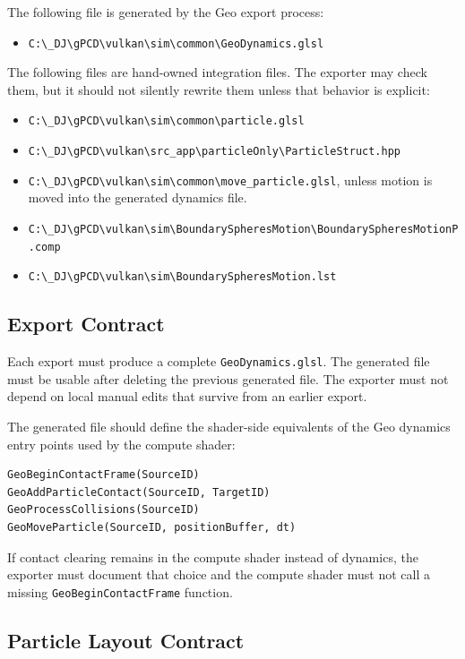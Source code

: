 The following file is generated by the Geo export process:

\begin{itemize}
    \item \verb|C:\_DJ\gPCD\vulkan\sim\common\GeoDynamics.glsl|
\end{itemize}

The following files are hand-owned integration files.  The exporter may check
them, but it should not silently rewrite them unless that behavior is explicit:

\begin{itemize}
    \item \verb|C:\_DJ\gPCD\vulkan\sim\common\particle.glsl|
    \item \verb|C:\_DJ\gPCD\vulkan\src_app\particleOnly\ParticleStruct.hpp|
    \item \verb|C:\_DJ\gPCD\vulkan\sim\common\move_particle.glsl|, unless
    motion is moved into the generated dynamics file.
    \item \verb|C:\_DJ\gPCD\vulkan\sim\BoundarySpheresMotion\BoundarySpheresMotionP.comp|
    \item \verb|C:\_DJ\gPCD\vulkan\sim\BoundarySpheresMotion.lst|
\end{itemize}

\subsection{Export Contract}

Each export must produce a complete \texttt{GeoDynamics.glsl}.  The generated
file must be usable after deleting the previous generated file.  The exporter
must not depend on local manual edits that survive from an earlier export.

The generated file should define the shader-side equivalents of the Geo
dynamics entry points used by the compute shader:

\begin{verbatim}
GeoBeginContactFrame(SourceID)
GeoAddParticleContact(SourceID, TargetID)
GeoProcessCollisions(SourceID)
GeoMoveParticle(SourceID, positionBuffer, dt)
\end{verbatim}

If contact clearing remains in the compute shader instead of dynamics, the
exporter must document that choice and the compute shader must not call a
missing \texttt{GeoBeginContactFrame} function.

\subsection{Particle Layout Contract}

